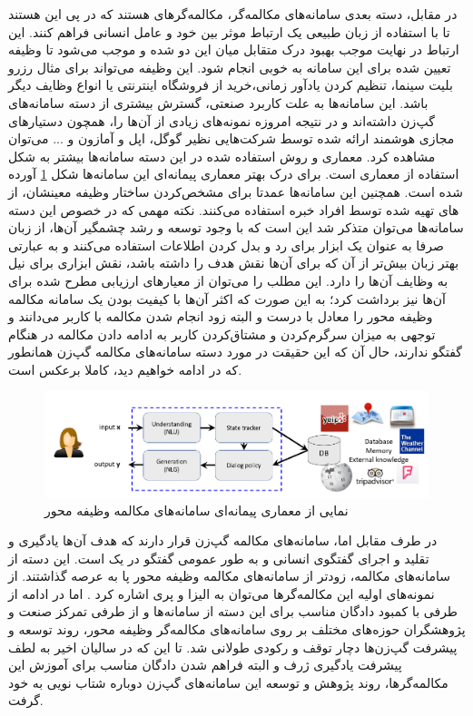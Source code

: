 در مقابل، دسته بعدی سامانه‌های مکالمه‌گر،‌ مکالمه‌گر‌های 
 هستند که در پی این هستند تا با استفاده از زبان طبیعی یک ارتباط موثر بین خود و عامل انسانی فراهم کنند. این ارتباط در نهایت موجب بهبود درک متقابل میان این دو شده و موجب می‌شود تا وظیفه تعیین شده
برای این سامانه به خوبی انجام شود.
این وظیفه می‌تواند برای مثال رزرو بلیت سینما، تنظیم کردن یاد‌آور زمانی،‌خرید از فروشگاه اینترنتی یا انواع وظایف دیگر باشد.
این سامانه‌ها به علت کاربرد صنعتی، گسترش بیشتری از دسته سامانه‌های گپ‌زن داشته‌اند و در نتیجه امروزه نمونه‌های زیادی از آن‌‌ها را، همچون دستیارهای مجازی هوشمند ارائه شده توسط شرکت‌هایی نظیر گوگل، اپل	 و آمازون و ... می‌توان مشاهده کرد. معماری و روش استفاده شده در این دسته سامانه‌ها بیشتر به شکل استفاده از معماری 
است. 
برای درک بهتر معماری پیمانه‌ای این سامانه‌ها شکل 
\ref{fig:chap1s:modular}
آورده شده است.
همچنین این سامانه‌ها عمدتا برای مشخص‌کردن ساختار وظیفه معینشان، از 
 های تهیه شده توسط افراد خبره استفاده می‌کنند.
نکته مهمی که در خصوص این دسته‌ سامانه‌ها می‌توان متذکر شد این است که با وجود توسعه و رشد چشمگیر آن‌ها، از زبان صرفا به عنوان یک ابزار برای رد و بدل کردن اطلاعات استفاده می‌کنند و به عبارتی بهتر زبان بیش‌تر از آن‌ که برای آن‌ها نقش هدف را داشته باشد، نقش ابزاری برای نیل به وظایف آن‌ها را دارد. این مطلب را می‌توان از معیارهای ارزیابی مطرح شده برای آن‌ها نیز برداشت کرد؛ به این صورت که اکثر آن‌ها با کیفیت بودن یک سامانه مکالمه وظیفه محور را معادل با درست و البته زود انجام شدن مکالمه با کاربر می‌دانند و توجهی به میزان سرگرم‌کردن و مشتاق‌کردن کاربر به ادامه دادن مکالمه در هنگام گفتگو ندارند، حال آن که این حقیقت در مورد دسته‌ سامانه‌های مکالمه گپ‌زن همانطور که در ادامه خواهیم دید، کاملا برعکس است.

\begin{figure}[h]
	\centering
	\includegraphics[width=1\textwidth]{images/chap1/modular.png}
	\caption{
		نمایی از معماری‌ پیمانه‌ای سامانه‌های مکالمه وظیفه محور
		\cite{Gao_Neural_Approaches}
	}
	\label{fig:chap1s:modular}
\end{figure}


در طرف مقابل اما، سامانه‌های مکالمه گپ‌زن قرار دارند که هدف آن‌ها یادگیری و تقلید و اجرای گفتگوی انسانی و به طور عمومی گفتگو در یک
است.
این دسته از سامانه‌های مکالمه، زودتر از سامانه‌های مکالمه وظیفه محور پا به عرصه گذاشتند.
از نمونه‌های اولیه این مکالمه‌گر‌ها می‌توان به الیزا و پری اشاره کرد
\cite{weizenbaum1966eliza, parry}
.
اما در ادامه از طرفی با کمبود دادگان مناسب برای این دسته از سامانه‌ها و از طرفی تمرکز صنعت و پژوهشگران حوزه‌های مختلف بر روی سامانه‌های مکالمه‌گر وظیفه محور، روند توسعه و پیشرفت گپ‌زن‌ها دچار توقف و رکودی طولانی شد. تا این که در سالیان اخیر به لطف پیشرفت یادگیری ژرف و البته فراهم‌ شدن دادگان مناسب برای آموزش این مکالمه‌گر‌ها، روند پژوهش و توسعه این سامانه‌های گپ‌زن دوباره شتاب نویی به خود گرفت.

